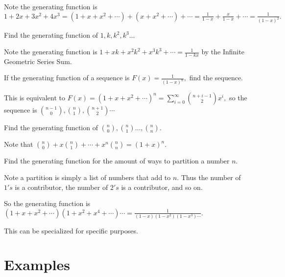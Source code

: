 \documentclass[mast]{lucky}
\begin{document}
\begin{sol}
Note the generating function is $1+2x+3x^2+4x^3=(1+x+x^2+\cdots)+(x+x^2+\cdots)+\cdots=\frac{1}{1-x}+\frac{x}{1-x}+\cdots=\frac{1}{(1-x)^2}.$
\end{sol}

\begin{exam}
Find the generating function of $1,k,k^2,k^3\dots$
\end{exam}

\begin{sol}
Note the generating function is $1+xk+x^2k^2+x^3k^3+\cdots=\frac{1}{1-kx}$ by the Infinite Geometric Series Sum.
\end{sol}

\begin{exam}
If the generating function of a sequence is $F(x)=\frac{1}{(1-x)^n},$ find the sequence.
\end{exam}

\begin{sol}
This is equivalent to $F(x)=(1+x+x^2+\cdots)^n=\sum\limits_{i=0}^{\infty}\binom{n+i-1}{2}x^i,$
so the sequence is $\binom{n-1}{0},\binom{n}{1},\binom{n+1}{2}\cdots$
\end{sol}

\begin{exam}
Find the generating function of $\binom{n}{0},\binom{n}{1}\dots,\binom{n}{n}.$
\end{exam}

\begin{sol}
Note that $\binom{n}{0}+x\binom{n}{1}+\cdots+x^n\binom{n}{n}=(1+x)^n.$
\end{sol}

\begin{exam}[Partitions]
Find the generating function for the amount of ways to partition a number $n.$
\end{exam}

\begin{sol}
Note a partition is simply a list of numbers that add to $n.$ Thus the number of $1's$ is a contributor, the number of $2's$ is a contributor, and so on.

So the generating function is $(1+x+x^2+\cdots)(1+x^2+x^4+\cdots)\cdots=\frac{1}{(1-x)(1-x^2)(1-x^3)\cdots}.$
\end{sol}

This can be specialized for specific purposes.

\section{Examples}
\end{document}
